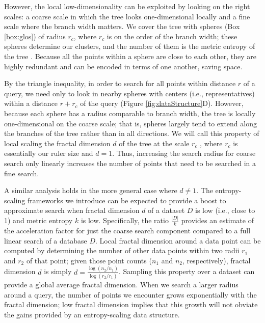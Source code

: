 \documentclass[11pt]{elsarticle}
\renewcommand{\cite}{\citep} %
\theoremstyle{definition}
\theoremstyle{remark}
\numberwithin{equation}{section}
\begin{document}
However, the local low-dimensionality can be exploited by looking on the right scales: a coarse scale in which the tree looks one-dimensional locally and a fine scale where the branch width matters.
We cover the tree with spheres (Box \ref{box:glos}) of radius $r_c$, where $r_c$ is on the order of the branch width; these spheres determine our clusters, and the number of them is the metric entropy of the tree \cite{tao2008product}.
Because all the points within a sphere are close to each other, they are highly 
redundant and can be encoded in terms of one another, saving space.

By the triangle inequality, in order to search for all points within distance $r$ of a query, we need only to look in nearby spheres with centers (i.e., representatives) within a distance $r+r_c$ of the query (Figure \ref{fig:dataStructure}D).
However, because each sphere has a radius comparable to branch width, the tree is locally one-dimensional on the coarse scale; that is, spheres largely tend to extend along the branches of the tree rather than in all directions.
We will call this property of local scaling the fractal dimension $d$ of the tree at the scale $r_c$ \cite{falconer1990fractal}, where $r_c$ is essentially our ruler size and $d=1$.
Thus, increasing the search radius for coarse search only linearly increases the number of points that need to be searched in a fine search.

A similar analysis holds in the more general case where $d \ne 1$.
The entropy-scaling frameworks we introduce can be expected to provide a boost to 
approximate search when fractal dimension $d$ of a dataset $D$ is low (i.e., close to 1) and metric
entropy $k$ is low.
Specifically, the ratio $\frac{|D|}{k}$ provides an estimate of the acceleration factor
for just the coarse search component compared to a full linear search of a database $D$.
Local fractal dimension around a data point can be computed by determining the
number of other data points within two radii $r_1$ and $r_2$ of that point;
given those point counts ($n_1$ and $n_2$, respectively), fractal dimension $d$
is simply $d=\frac{\log (n_2 / n_1)}{ \log (r_2 / r_1)}$.
Sampling this property over a dataset can provide a global average fractal 
dimension.
When we search a larger radius around a query, the number of points we encounter grows exponentially with the fractal dimension;
low fractal dimension implies that this growth will not obviate the gains provided by an entropy-scaling data structure.
\end{document}

